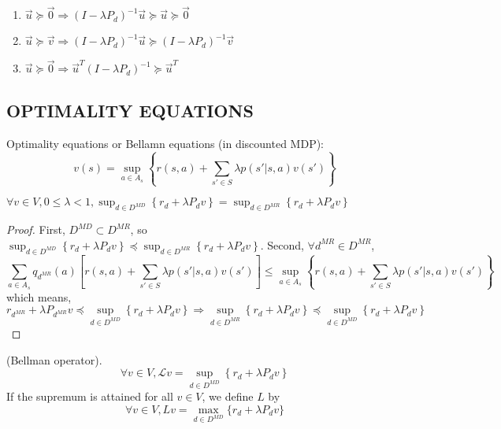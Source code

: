 \begin{lemma}
    \begin{enumerate}
        \item $ \vec u \succeq \vec 0 \Rightarrow {(I - \lambda P_d)}^{-1} \vec u \succeq \vec u \succeq \vec 0 $
        \item $ \vec u \succeq \vec v \Rightarrow {(I - \lambda P_d)}^{-1} \vec u \succeq {(I - \lambda P_d)}^{-1} \vec v $
        \item $ \vec u \succeq \vec 0 \Rightarrow \vec u^T {(I - \lambda P_d)}^{-1} \succeq \vec u^T $
    \end{enumerate}
\end{lemma}

\subsection{OPTIMALITY EQUATIONS}%
\label{sub:optimality_equations}

Optimality equations or Bellamn equations (in discounted MDP):
\[
    v(s) = \sup_{a \in A_s} \left\{ r(s, a) + \sum^{}_{s' \in S} \lambda p(s' | s, a) v(s') \right\}
\]

\begin{lemma}
    $ \forall v \in V, 0 \le \lambda < 1, \sup_{d \in D^{MD}} \left\{ r_d + \lambda P_d v \right\}
    = \sup_{d \in D^{MR}} \left\{ r_d + \lambda P_d v \right\}$ 
    \begin{proof}
        First, $ D^{MD} \subset D^{MR} $, so $ \sup_{d \in D^{MD}} \left\{ r_d + \lambda P_d v \right\}
    \preceq \sup_{d \in D^{MR}} \left\{ r_d + \lambda P_d v \right\} $.
    Second, $ \forall d^{MR} \in D^{MR} $,
    \[
        \sum^{}_{a \in A_s} q_{d^{MR}}(a) \left[ r(s, a) + \sum^{}_{s' \in S} \lambda p(s' | s, a) v(s') \right]
        \le \sup_{a \in A_s} \left\{ r(s, a) + \sum^{}_{s' \in S} \lambda p(s'|s, a) v(s') \right\}
    \]
    which means,
    \[
        r_{d^{MR}} +  \lambda P_{d^{MR}} v \preceq \sup_{d \in D^{MD}} \left\{ r_d + \lambda P_d v \right\}
        \Rightarrow \sup_{d \in D^{MR}}\left\{ r_d + \lambda P_d v \right\}
        \preceq \sup_{d \in D^{MD}}\left\{ r_d + \lambda P_d v \right\}
    \]
    
    \end{proof}
\end{lemma}

\begin{definition}
    (Bellman operator).
    \begin{equation}
        \forall v \in V, \mathcal{L} v = \sup_{d \in D^{MD}} \left\{ r_d + \lambda P_d v \right\}
    \end{equation}
    If the supremum is attained for all $ v \in V $, we define $ L $ by
    \begin{equation}
        \forall v \in V, Lv = \max_{d \in D^{MD}}\{r_d + \lambda P_d v\}
    \end{equation}
\end{definition}

